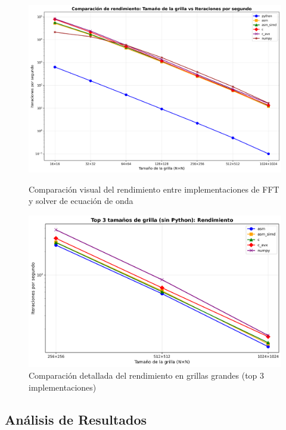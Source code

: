 \documentclass[a4paper]{article}
\begin{document}
\begin{figure}[h]
    \centering
    \begin{minipage}[t]{0.48\textwidth}
        \centering
        \includegraphics[width=\textwidth]{extra/steps_per_second.png}
        \caption{Comparación visual del rendimiento entre implementaciones de FFT y solver de ecuación de onda}
        \label{fig:performance}
    \end{minipage}
    \hfill
    \begin{minipage}[t]{0.48\textwidth}
        \centering
        \includegraphics[width=\textwidth]{extra/steps_per_second_top3.png}
        \caption{Comparación detallada del rendimiento en grillas grandes (top 3 implementaciones)}
        \label{fig:performance_top3}
    \end{minipage}
\end{figure}

\subsection{Análisis de Resultados}
\end{document}
